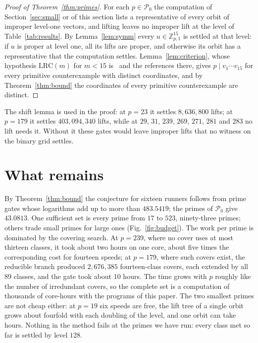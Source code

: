 \documentclass[aps,prd,twocolumn,superscriptaddress,nofootinbib,longbibliography,floatfix,showkeys,amsmath,amssymb,10pt]{revtex4-2}
\theoremstyle{definition}
\theoremstyle{remark}
\newcommand{\Z}{\mathbb{Z}}
\newcommand{\LRC}{\mathrm{LRC}}
\begin{document}
\begin{proof}[Proof of Theorem~\ref{thm:primes}]
For each $p\in\mathcal P_0$ the computation of Section~\ref{sec:small} or of
this section lists a representative of every orbit of improper level-one
vectors, and lifting leaves no improper lift at the level of
Table~\ref{tab:results}. By Lemma~\ref{lem:symm} every $u\in\Z_{p,1}^{15}$ is
settled at that level: if $u$ is proper at level one, all its lifts are
proper, and otherwise its orbit has a representative that the computation
settles. Lemma~\ref{lem:criterion}, whose hypothesis $\LRC(m)$ for $m<15$
is~\cite{All26} and the references there, gives $p\mid v_1\cdots v_{15}$ for
every primitive counterexample with distinct coordinates, and by
Theorem~\ref{thm:bound} the coordinates of every primitive counterexample are
distinct.
\end{proof}

The shift lemma is used in the proof: at $p=23$ it settles $8{,}636{,}800$ lifts; at $p=179$ it settles $403{,}094{,}340$ lifts, while at $29$, $31$, $239$, $269$, $271$, $281$ and $283$ no lift needs it. Without it these gates would leave improper lifts that no witness on the binary grid settles.

\section{What remains}\label{sec:remains}

By Theorem~\ref{thm:bound} the conjecture for sixteen runners follows from
prime gates whose logarithms add up to more than $483.5419$; the primes of
$\mathcal P_0$ give $43.0813$. One sufficient set is every prime from
$17$ to $523$, ninety-three primes; others trade small primes for large ones
(Fig.~\ref{fig:budget}). The work per prime is dominated by the covering
search. At $p=239$, where no cover uses at most thirteen classes, it took
about two hours on one core, about five times the corresponding cost for
fourteen speeds; at $p=179$, where such covers exist, the reducible branch
produced $2{,}676{,}385$ fourteen-class covers, each extended by all
$89$ classes, and the gate took about 10 hours. The time
grows with $p$ roughly like the number of irredundant covers, so the
complete set is a computation of thousands of core-hours with the programs
of this paper. The two smallest primes are not cheap either: at $p=19$ six
speeds are free, the lift tree of a single orbit grows about fourfold with
each doubling of the level, and one orbit can take hours. Nothing in the
method fails at the primes we have run: every class met so far is settled
by level $128$.
\end{document}
